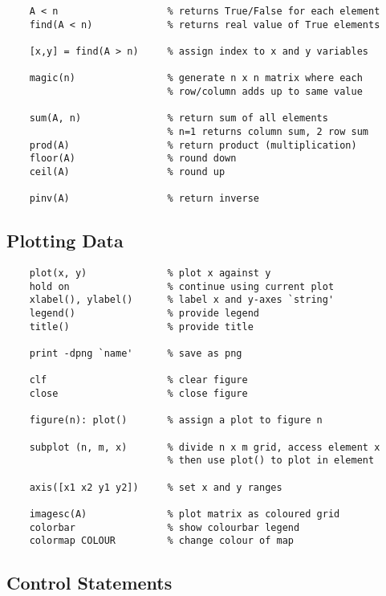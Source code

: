 \documentclass[12pt] {article}
\begin{document}
{\begin{lstlisting}
    A < n                   % returns True/False for each element
    find(A < n)             % returns real value of True elements

    [x,y] = find(A > n)     % assign index to x and y variables
    
    magic(n)                % generate n x n matrix where each
                            % row/column adds up to same value

    sum(A, n)               % return sum of all elements
                            % n=1 returns column sum, 2 row sum
    prod(A)                 % return product (multiplication)
    floor(A)                % round down
    ceil(A)                 % round up

    pinv(A)                 % return inverse
    \end{lstlisting}
   
  \newpage

  \subsection{Plotting Data}

    \begin{lstlisting}
    plot(x, y)              % plot x against y
    hold on                 % continue using current plot
    xlabel(), ylabel()      % label x and y-axes `string'
    legend()                % provide legend
    title()                 % provide title

    print -dpng `name'      % save as png

    clf                     % clear figure
    close                   % close figure

    figure(n): plot()       % assign a plot to figure n
    
    subplot (n, m, x)       % divide n x m grid, access element x
                            % then use plot() to plot in element

    axis([x1 x2 y1 y2])     % set x and y ranges

    imagesc(A)              % plot matrix as coloured grid
    colorbar                % show colourbar legend
    colormap COLOUR         % change colour of map
    \end{lstlisting}
    \vspace{1em}

  \subsection{Control Statements}

}
\end{document}
